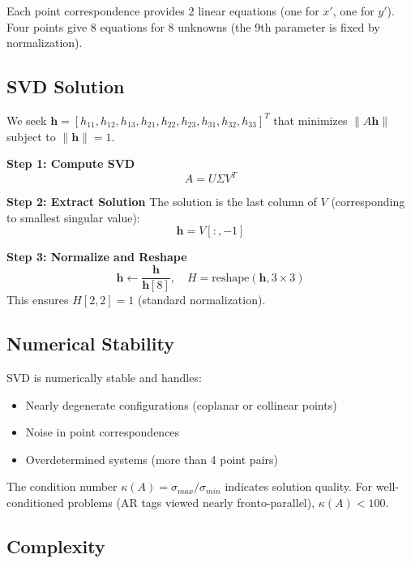 \documentclass[9pt,a4paper,twocolumn,twoside]{tau-class/tau}
\begin{document}
    Each point correspondence provides 2 linear equations (one for $x'$, one for $y'$). Four points give 8 equations for 8 unknowns (the 9th parameter is fixed by normalization).

    \subsection{SVD Solution}

    We seek $\mathbf{h} = [h_{11}, h_{12}, h_{13}, h_{21}, h_{22}, h_{23}, h_{31}, h_{32}, h_{33}]^T$ that minimizes $\|A\mathbf{h}\|$ subject to $\|\mathbf{h}\| = 1$.

    \textbf{Step 1: Compute SVD}
    \begin{equation}
        A = U \Sigma V^T
    \end{equation}

    \textbf{Step 2: Extract Solution}
    The solution is the last column of $V$ (corresponding to smallest singular value):
    \begin{equation}
        \mathbf{h} = V[:, -1]
    \end{equation}

    \textbf{Step 3: Normalize and Reshape}
    \begin{equation}
        \mathbf{h} \leftarrow \frac{\mathbf{h}}{\mathbf{h}[8]}, \quad H = \text{reshape}(\mathbf{h}, 3 \times 3)
    \end{equation}
    This ensures $H[2, 2] = 1$ (standard normalization).

    \subsection{Numerical Stability}

    SVD is numerically stable and handles:
    \begin{itemize}
        \item Nearly degenerate configurations (coplanar or collinear points)
        \item Noise in point correspondences
        \item Overdetermined systems (more than 4 point pairs)
    \end{itemize}

    The condition number $\kappa(A) = \sigma_{max} / \sigma_{min}$ indicates solution quality. For well-conditioned problems (AR tags viewed nearly fronto-parallel), $\kappa(A) < 100$.

    \subsection{Complexity}
\end{document}
